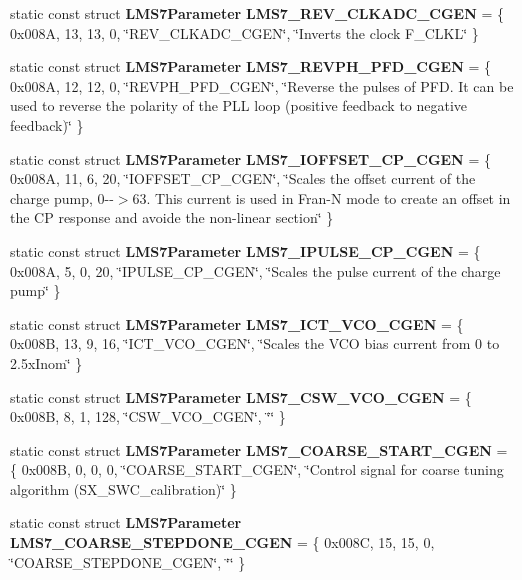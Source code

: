 \begin{DoxyCompactItemize}
\item 
static const struct {\bf L\+M\+S7\+Parameter} {\bf L\+M\+S7\+\_\+\+R\+E\+V\+\_\+\+C\+L\+K\+A\+D\+C\+\_\+\+C\+G\+EN} = \{ 0x008\+A, 13, 13, 0, \char`\"{}\+R\+E\+V\+\_\+\+C\+L\+K\+A\+D\+C\+\_\+\+C\+G\+E\+N\char`\"{}, \char`\"{}\+Inverts the clock F\+\_\+\+C\+L\+K\+L\char`\"{} \}
\item 
static const struct {\bf L\+M\+S7\+Parameter} {\bf L\+M\+S7\+\_\+\+R\+E\+V\+P\+H\+\_\+\+P\+F\+D\+\_\+\+C\+G\+EN} = \{ 0x008\+A, 12, 12, 0, \char`\"{}\+R\+E\+V\+P\+H\+\_\+\+P\+F\+D\+\_\+\+C\+G\+E\+N\char`\"{}, \char`\"{}\+Reverse the pulses of P\+F\+D. It can be used to reverse the polarity of the P\+L\+L loop (positive feedback to negative feedback)\char`\"{} \}
\item 
static const struct {\bf L\+M\+S7\+Parameter} {\bf L\+M\+S7\+\_\+\+I\+O\+F\+F\+S\+E\+T\+\_\+\+C\+P\+\_\+\+C\+G\+EN} = \{ 0x008\+A, 11, 6, 20, \char`\"{}\+I\+O\+F\+F\+S\+E\+T\+\_\+\+C\+P\+\_\+\+C\+G\+E\+N\char`\"{}, \char`\"{}\+Scales the offset current of the charge pump, 0-\/-\/$>$63. This current is used in Fran-\/\+N mode to create an offset in the C\+P response and avoide the non-\/linear section\char`\"{} \}
\item 
static const struct {\bf L\+M\+S7\+Parameter} {\bf L\+M\+S7\+\_\+\+I\+P\+U\+L\+S\+E\+\_\+\+C\+P\+\_\+\+C\+G\+EN} = \{ 0x008\+A, 5, 0, 20, \char`\"{}\+I\+P\+U\+L\+S\+E\+\_\+\+C\+P\+\_\+\+C\+G\+E\+N\char`\"{}, \char`\"{}\+Scales the pulse current of the charge pump\char`\"{} \}
\item 
static const struct {\bf L\+M\+S7\+Parameter} {\bf L\+M\+S7\+\_\+\+I\+C\+T\+\_\+\+V\+C\+O\+\_\+\+C\+G\+EN} = \{ 0x008\+B, 13, 9, 16, \char`\"{}\+I\+C\+T\+\_\+\+V\+C\+O\+\_\+\+C\+G\+E\+N\char`\"{}, \char`\"{}\+Scales the V\+C\+O bias current from 0 to 2.\+5x\+Inom\char`\"{} \}
\item 
static const struct {\bf L\+M\+S7\+Parameter} {\bf L\+M\+S7\+\_\+\+C\+S\+W\+\_\+\+V\+C\+O\+\_\+\+C\+G\+EN} = \{ 0x008\+B, 8, 1, 128, \char`\"{}\+C\+S\+W\+\_\+\+V\+C\+O\+\_\+\+C\+G\+E\+N\char`\"{}, \char`\"{}\char`\"{} \}
\item 
static const struct {\bf L\+M\+S7\+Parameter} {\bf L\+M\+S7\+\_\+\+C\+O\+A\+R\+S\+E\+\_\+\+S\+T\+A\+R\+T\+\_\+\+C\+G\+EN} = \{ 0x008\+B, 0, 0, 0, \char`\"{}\+C\+O\+A\+R\+S\+E\+\_\+\+S\+T\+A\+R\+T\+\_\+\+C\+G\+E\+N\char`\"{}, \char`\"{}\+Control signal for coarse tuning algorithm (\+S\+X\+\_\+\+S\+W\+C\+\_\+calibration)\char`\"{} \}
\item 
static const struct {\bf L\+M\+S7\+Parameter} {\bf L\+M\+S7\+\_\+\+C\+O\+A\+R\+S\+E\+\_\+\+S\+T\+E\+P\+D\+O\+N\+E\+\_\+\+C\+G\+EN} = \{ 0x008\+C, 15, 15, 0, \char`\"{}\+C\+O\+A\+R\+S\+E\+\_\+\+S\+T\+E\+P\+D\+O\+N\+E\+\_\+\+C\+G\+E\+N\char`\"{}, \char`\"{}\char`\"{} \}

\end{DoxyCompactItemize}
